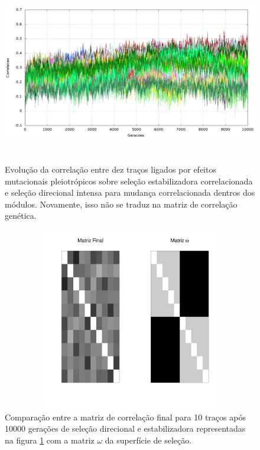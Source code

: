 \documentclass[a4paper, 12pt, titlepage, onecolumn]{article}
\numberwithin{equation}{section}
\numberwithin{table}{section}
\begin{document}
\begin{center}
\begin{figure}[H]
  \includegraphics[width=150mm, height=80mm]{figuras/jones10tracosDirecional.png}
  \caption{Evolução da correlação entre dez traços ligados por efeitos
  mutacionais pleiotrópicos sobre seleção estabilizadora correlacionada
  e seleção direcional intensa para mudança correlacionada dentros dos
  módulos. Novamente, isso não se traduz na matriz de correlação genética.}
  \label{jones10tracosDirecional}
\end{figure}
\end{center}

\begin{center}
\begin{figure}[H]
  \includegraphics[width=150mm, height=80mm]{figuras/Mat10tracosDirecional}
   \caption{Comparação entre a matriz de correlação final para 10
   traços após 10000
   gerações de seleção direcional e estabilizadora representadas na figura \ref{jones10tracosDirecional} com a matriz $\omega$ da superfície de seleção.}
  \label{MatJones10tracosDirecional}
\end{figure}
\end{center}
\end{document}
